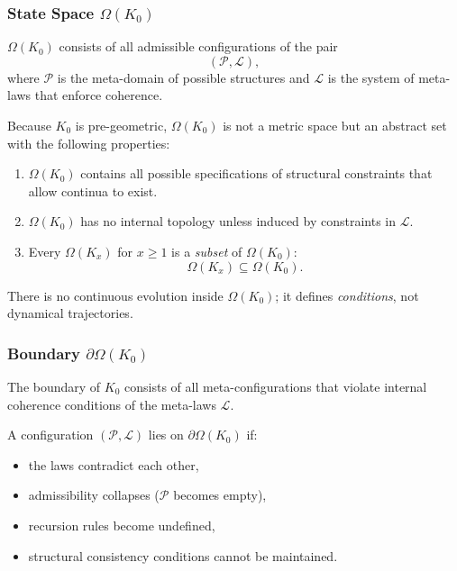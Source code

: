 \subsubsection{State Space \texorpdfstring{$\Omega(K_0)$}{\Omega(K_0)}}

$\Omega(K_0)$ consists of all admissible configurations of the pair
\[
(\mathcal{P}, \mathcal{L}),
\]
where $\mathcal{P}$ is the meta-domain of possible structures and
$\mathcal{L}$ is the system of meta-laws that enforce coherence.

Because $K_0$ is pre-geometric, $\Omega(K_0)$ is not a metric space but
an abstract set with the following properties:
\begin{enumerate}
    \item $\Omega(K_0)$ contains all possible specifications of
          structural constraints that allow continua to exist.
    \item $\Omega(K_0)$ has no internal topology unless induced by
          constraints in $\mathcal{L}$.
    \item Every $\Omega(K_x)$ for $x \ge 1$ is a \emph{subset} of
          $\Omega(K_0)$:
          \[
              \Omega(K_x) \subseteq \Omega(K_0).
          \]
\end{enumerate}

There is no continuous evolution inside $\Omega(K_0)$; it defines
\emph{conditions}, not dynamical trajectories.

\subsubsection{Boundary \texorpdfstring{$\partial\Omega(K_0)$}{\partial\Omega(K_0)}}

The boundary of $K_0$ consists of all meta-configurations that violate
internal coherence conditions of the meta-laws $\mathcal{L}$.

A configuration $(\mathcal{P},\mathcal{L})$ lies on $\partial\Omega(K_0)$ if:
\begin{itemize}
    \item the laws contradict each other,
    \item admissibility collapses ($\mathcal{P}$ becomes empty),
    \item recursion rules become undefined,
    \item structural consistency conditions cannot be maintained.
\end{itemize}

